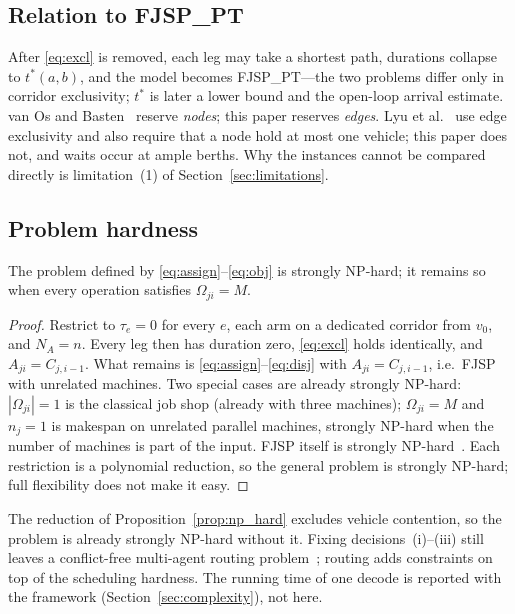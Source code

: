 \subsection{Relation to FJSP\_PT}
\label{sec:fjsppt}

After \eqref{eq:excl} is removed, each leg may take a shortest path, durations collapse to $t^{*}(a,b)$, and the model becomes FJSP\_PT---the two problems differ only in corridor exclusivity; $t^{*}$ is later a lower bound and the open-loop arrival estimate.
van Os and Basten~\cite{vanos2026exact} reserve \emph{nodes}; this paper reserves \emph{edges}.
Lyu et al.~\cite{lyu2019approach} use edge exclusivity and also require that a node hold at most one vehicle; this paper does not, and waits occur at ample berths.
Why the instances cannot be compared directly is limitation~(1) of Section~\ref{sec:limitations}.

\subsection{Problem hardness}

\begin{prop}
\label{prop:np_hard}
The problem defined by \eqref{eq:assign}--\eqref{eq:obj} is strongly NP-hard; it remains so when every operation satisfies
$\Omega_{ji}=M$.
\end{prop}

\begin{proof}
Restrict to $\tau_e=0$ for every $e$, each arm on a dedicated corridor from $v_0$, and $N_A=n$.
Every leg then has duration zero, \eqref{eq:excl} holds identically, and $A_{ji}=C_{j,i-1}$.
What remains is \eqref{eq:assign}--\eqref{eq:disj} with $A_{ji}=C_{j,i-1}$, i.e.\ FJSP with unrelated machines.
Two special cases are already strongly NP-hard: $|\Omega_{ji}|=1$ is the classical job shop (already with three machines); $\Omega_{ji}=M$ and $n_j=1$ is makespan on unrelated parallel machines, strongly NP-hard when the number of machines is part of the input.
FJSP itself is strongly NP-hard~\cite{dauzereperes2024fjsp}.
Each restriction is a polynomial reduction, so the general problem is strongly NP-hard; full flexibility does not make it easy.
\end{proof}

The reduction of Proposition~\ref{prop:np_hard} excludes vehicle contention, so the problem is already strongly NP-hard without it.
Fixing decisions~(i)--(iii) still leaves a conflict-free multi-agent routing problem~\cite{gao2023mapf}; routing adds constraints on top of the scheduling hardness.
The running time of one decode is reported with the framework (Section~\ref{sec:complexity}), not here.


